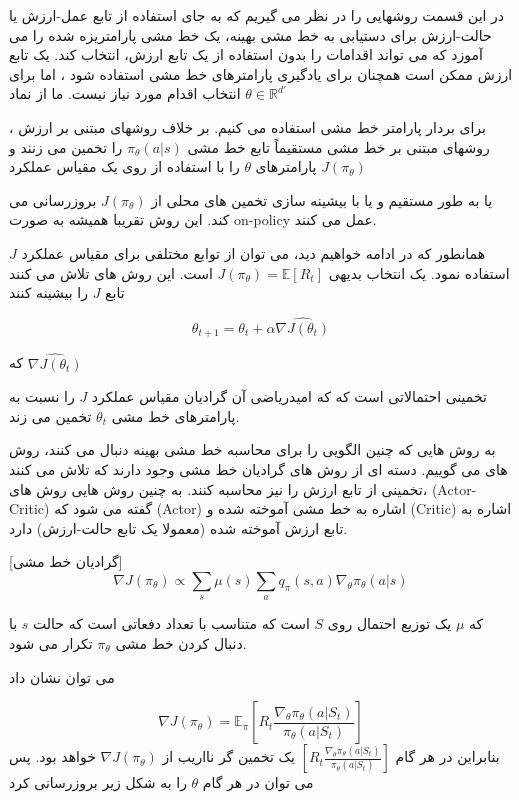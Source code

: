 
در این قسمت روشهایی را در نظر می گیریم که به جای استفاده از تابع عمل-ارزش یا حالت-ارزش برای دستیابی به خط مشی بهینه، یک خط مشی پارامتریزه  شده را می آموزد که می تواند اقدامات را بدون استفاده از یک تابع ارزش، انتخاب کند. یک تابع ارزش
ممکن است همچنان برای یادگیری پارامترهای خط مشی استفاده شود ، اما برای انتخاب اقدام مورد نیاز نیست. ما از نماد
$\theta \in \mathbb{R}^{d'}$
 


برای بردار پارامتر خط مشی استفاده می کنیم.
بر خلاف روشهای مبتنی بر ارزش ، روشهای مبتنی بر خط مشی مستقیماً تابع خط مشی 
$\pi_\theta(a|s)$
 را تخمین می زنند و پارامترهای $\theta$ را با استفاده از  روی یک مقیاس عملکرد  
$J(\pi_\theta)$

یا به طور مستقیم و یا با بیشینه سازی تخمین های محلی از 
$J(\pi_\theta)$
بروزرسانی می کند.  این روش تقریبا همیشه به صورت on-policy  عمل می کنند. 

همانطور که در ادامه خواهیم دید، می توان از توابع مختلفی برای مقیاس عملکرد $J$ استفاده نمود. یک انتخاب بدیهی 
$J(\pi_\theta) = \mathbb{E}[R_t]$
است. این روش های تلاش می کنند تابع $J$ را بیشینه کنند

$$\theta_{t+1}=\theta_t + \alpha \hat{\nabla J(\theta_t)}$$

که 
$\hat{\nabla J(\theta_t)}$

تخمینی احتمالاتی است که که امیدریاضی آن گرادیان مقیاس عملکرد $J$ را نسبت به پارامترهای خط مشی $\theta_t$ تخمین می زند.

به روش هایی که چنین الگویی را برای محاسبه خط مشی بهینه دنبال می کنند، روش های   می گوییم. دسته ای از روش های گرادیان خط مشی وجود دارند که تلاش می کنند تخمینی از تابع ارزش را نیز محاسبه کنند. به چنین روش هایی روش های،  (Actor-Critic) گفته می شود که  (Actor) اشاره به خط مشی آموخته شده و  (Critic) اشاره به تابع ارزش آموخته شده (معمولا یک تابع حالت-ارزش) دارد.

[گرادیان خط مشی]
$$\nabla J(\pi_\theta) \propto \sum_{s} \mu(s) \sum_{a} q_\pi(s,a) \nabla_\theta \pi_\theta(a|s)$$

که $\mu$ یک توزیع احتمال روی $S$ است که متناسب با تعداد دفعاتی است که حالت $s$ با دنبال کردن خط مشی 
$\pi_\theta$
 تکرار می شود.


می توان نشان داد 
\cite{(suttonbook)}

$$\nabla J(\pi_\theta) = \mathbb{E}_\pi \left[ R_t \frac{\nabla_\theta \pi_\theta (a|S_t)}{\pi_\theta (a|S_t)} \right]$$
بنابراین در هر گام
$\left[ R_t \frac{\nabla_\theta \pi_\theta (a|S_t)}{\pi_\theta (a|S_t)} \right]$
یک تخمین گر نااریب از $\nabla J(\pi_\theta)$ خواهد بود. پس می توان در هر گام $\theta$ را به شکل زیر بروزرسانی کرد

